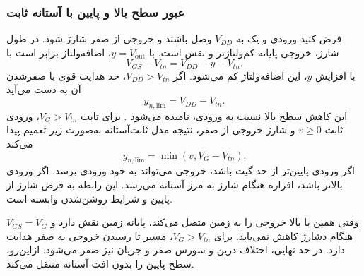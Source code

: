 \subsubsection{عبور سطح بالا و پایین با آستانه ثابت}
\label{sec:pass-threshold-drop}
فرض کنید ورودی و  یک  به
\(V_{DD}\) وصل باشند و خروجی از صفر شارژ شود.
در طول شارژ، خروجی پایانه کم‌ولتاژتر و نقش  است.
با \(y=V_{\mathrm{out}}\)، اضافه‌ولتاژ برابر است با
\begin{equation*}
 V_{GS}-V_{tn}=V_{DD}-y-V_{tn}.
\end{equation*}
با افزایش \(y\)، این اضافه‌ولتاژ کم می‌شود. اگر
\(V_{DD}>V_{tn}\)، حد هدایت قوی با صفرشدن آن به دست می‌آید
\begin{equation}
 \boxed{y_{n,\mathrm{lim}}=V_{DD}-V_{tn}}.
 \label{eq:pass-n-high-limit}
\end{equation}
این کاهش سطح بالا نسبت به ورودی،  نامیده
می‌شود \cite[شکل ]{weste}.
برای  ثابت \(V_G>V_{tn}\)، ورودی ثابت
\(v\ge0\) و شارژ خروجی از صفر، نتیجه مدل ثابت‌آستانه
به‌صورت زیر تعمیم پیدا می‌کند
\begin{equation}
 y_{n,\mathrm{lim}}=\min(v,V_G-V_{tn}).
 \label{eq:pass-n-min-rule}
\end{equation}
اگر ورودی پایین‌تر از حد گیت باشد، خروجی می‌تواند به خود ورودی
برسد. اگر ورودی بالاتر باشد، افزاره هنگام شارژ به مرز آستانه
می‌رسد. این رابطه به فرض شارژ از پایین و شرایط روشن‌شدن وابسته است.

وقتی همین  با  بالا خروجی را به زمین
متصل می‌کند، پایانه زمین نقش  دارد و
\(V_{GS}=V_G\) هنگام دشارژ کاهش نمی‌یابد.
برای \(V_G>V_{tn}\)، مسیر تا رسیدن خروجی به صفر هدایت دارد.
در حد نهایی، اختلاف درین و سورس صفر و جریان نیز صفر می‌شود.
ازاین‌رو،  سطح پایین را بدون افت آستانه منتقل می‌کند.


